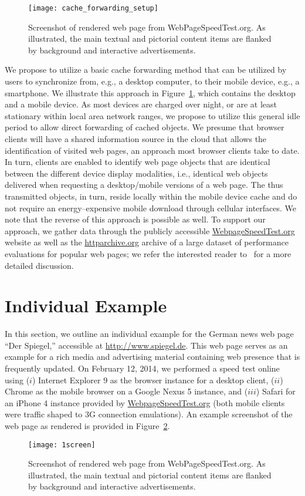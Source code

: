 \begin{figure}
\centering
\texttt{[image: cache\_forwarding\_setup]}
	\caption{Screenshot of rendered web page from WebPageSpeedTest.org. As illustrated, the main textual and pictorial content items are flanked by background and interactive advertisements.}
\label{fig:cache_forwarding_setup}
\end{figure}

We propose to utilize a basic cache forwarding method that can be utilized by users to synchronize from, e.g., a desktop computer, to their mobile device, e.g., a smartphone.
We illustrate this approach in Figure~\ref{fig:cache_forwarding_setup}, which contains the desktop and a mobile device. 
As most devices are charged over night, or are at least stationary within local area network ranges, we propose to utilize this general idle period to allow direct forwarding of cached objects.
We presume that browser clients will have a shared information source in the cloud that allows the identification of visited web pages, an approach most browser clients take to date.
In turn, clients are enabled to identify web page objects that are identical between the different device display modalities, i.e., identical web objects delivered when requesting a desktop/mobile versions of a web page.
The thus transmitted objects, in turn, reside locally within the mobile device cache and do not require an energy--expensive mobile download through cellular interfaces. 
We note that the reverse of this approach is possible as well.
To support our approach, we gather data through the publicly accessible \url{WebpageSpeedTest.org} website as well as the \url{httparchive.org} archive of a large dataset of performance evaluations for popular web pages; we refer the interested reader to~\cite{Me13} for a more detailed discussion.

\section*{Individual Example}
\label{s:example}
In this section, we outline an individual example for the German news web page ``Der Spiegel,'' accessible at \url{http://www.spiegel.de}.
This web page serves as an example for a rich media and advertising material containing web presence that is frequently updated.
On February 12, 2014, we performed a speed test online using ($i$) Internet Explorer 9 as the browser instance for a desktop client, ($ii$) Chrome as the mobile browser on a Google Nexus 5 instance, and ($iii$) Safari for an iPhone 4 instance provided by \url{WebpageSpeedTest.org} (both mobile clients were traffic shaped to 3G connection emulations).
An example screenshot of the web page as rendered is provided in Figure~\ref{fig:screens}.
\begin{figure}
\centering
\texttt{[image: 1screen]}
	\caption{Screenshot of rendered web page from WebPageSpeedTest.org. As illustrated, the main textual and pictorial content items are flanked by background and interactive advertisements.}
\label{fig:screens}
\end{figure}

